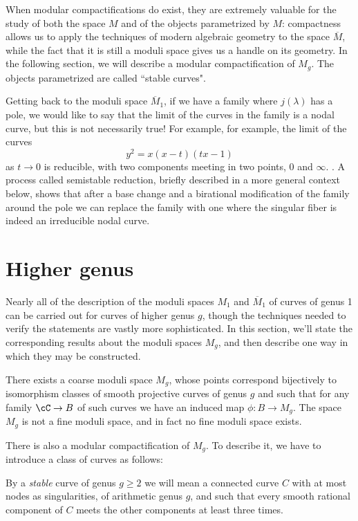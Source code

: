  When modular compactifications do exist, they are extremely valuable for the study of both the space $M$ and of the objects parametrized by $M$: compactness allows us to apply the techniques of modern algebraic geometry to the space $\overline M$, while the fact that it is still a moduli space gives us a handle on its geometry. In the following section, we will describe a modular compactification of $M_g$. The objects parametrized are called ``stable curves". 

Getting back to the moduli space $\overline M_1$, if we have a family where
$j(\lambda)$ has a pole, we would like to say that the limit of the curves in the family is a nodal curve,
but this is not necessarily true! For example, for example, the limit of the curves
$$
y^2 = x(x-t)(tx-1)
$$
as $t \to 0$ is reducible, with two components meeting in two points, 0 and $\infty$.
. A process called semistable reduction, briefly described in a more general context below, shows that after a base change and a birational
modification of the family around the pole we can replace the family with one where the singular fiber
is indeed an irreducible nodal curve.
\section{Higher genus}

Nearly all of the description of the moduli spaces $M_1$ and $\overline M_1$ of curves of genus 1 can be carried out for curves of higher genus $g$,  though the techniques needed to verify the statements are vastly more sophisticated. In this section, we'll state the corresponding results about the moduli spaces $M_g$, and then describe one way in which they may be constructed.

\begin{theorem}\label{moduli}
There exists a coarse moduli space $M_g$, whose points correspond bijectively to isomorphism classes of smooth projective curves of genus $g$ and such that for any family $\cC \to B$ of such curves we have an induced map $\phi : B \to M_g$. The space $M_g$ is not a fine moduli space, and in fact no fine moduli space exists.
\end{theorem}


There is also a modular compactification of $M_g$. To describe it, we have to introduce a class of curves as follows:

\begin{definition}
By a \emph{stable} curve of genus $g \geq 2$ we will mean a connected curve $C$ with at most nodes as singularities, of arithmetic genus $g$, and such that every smooth rational component of $C$ meets the other components at least three times.
\end{definition}

